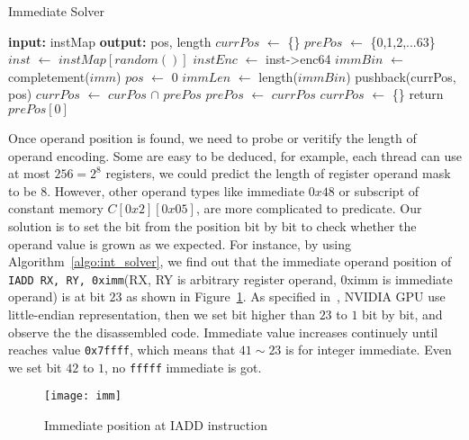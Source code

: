 \begin{algorithm}
      \caption{Immediate Solver}
      \label{algo:int_solver}
  \begin{algorithmic}[1]
	  \State \textbf{input:} instMap
      \State \textbf{output:} pos, length
	  \LeftComment {}
      \State $currPos$ $\gets$ \{\}
      \State $prePos$ $\gets$ \{0,1,2,...63\}
      \State $inst$ $\gets$ $instMap[random()]$
      \State $instEnc$ $\gets$ inst->enc64
      \State $immBin$ $\gets$ completement($imm$)
      \State $pos$ $\gets$ 0
      \State $immLen$ $\gets$ length($immBin$)
      \State pushback(currPos, pos)
      \EndIf
      \EndWhile
      \State $currPos$ $\gets$ $curPos$ $\cap$ $prePos$
      \State $prePos$ $\gets$ $currPos$
      \State $currPos$ $\gets$ \{\}
      \EndIf
      \EndWhile
      \State return $prePos[0]$
  \end{algorithmic}
\end{algorithm}

Once operand position is found, we need to probe or veritify the length of operand encoding. Some are easy to be
deduced, for example, each thread can use at most $256=2^{8}$ registers, we could predict the length of register operand mask to be $8$.
However, other operand types like immediate $0x48$ or subscript of constant memory $C[0x2][0x05]$, are more complicated to predicate. Our solution is to set the bit from the position bit by bit to check whether the operand value is grown as we expected. For instance, by using Algorithm~\ref{algo:int_solver}, we find out that the immediate operand position of {\tt IADD RX, RY, 0ximm}(RX, RY is arbitrary register operand, 0ximm is immediate operand) is at bit $23$ as shown in Figure~\ref{fig:imm}. As specified in~\cite{cuda2015programming}, NVIDIA GPU use little-endian representation, then we set bit higher than $23$ to $1$ bit by bit, and observe the the disassembled code. Immediate value increases continuely until reaches value {\tt 0x7ffff}, which means that $41\sim23$ is for integer immediate. Even we set bit $42$ to $1$, no {\tt fffff} immediate is got. 

\begin{figure}[htbp]
\begin{center}
\texttt{[image: imm]}
    \caption{Immediate position at IADD instruction}
\label{fig:imm}
\end{center}
\end{figure}

